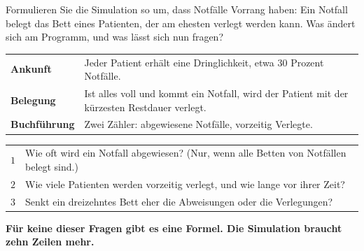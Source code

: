 \begin{aufgabe}
Formulieren Sie die Simulation so um, dass Notfälle Vorrang haben: Ein Notfall belegt das Bett eines Patienten, der am ehesten verlegt werden kann. Was ändert sich am Programm, und was lässt sich nun fragen?

\loesung
{}
\begin{center}
{\small
\renewcommand{\arraystretch}{1.5}
\begin{tabular}{@{}P{2.6cm}P{6.0cm}@{}}
\toprule
\textbf{Ankunft} & Jeder Patient erhält eine Dringlichkeit, etwa $30$ Prozent Notfälle.\\
\textbf{Belegung} & Ist alles voll und kommt ein Notfall, wird der Patient mit der kürzesten Restdauer verlegt.\\
\textbf{Buchführung} & Zwei Zähler: abgewiesene Notfälle, vorzeitig Verlegte.\\
\bottomrule
\end{tabular}}
\end{center}

\begin{center}
{\small
\renewcommand{\arraystretch}{1.5}
\begin{tabular}{@{}P{1.0cm}P{7.4cm}@{}}
\toprule
$1$ & Wie oft wird ein Notfall abgewiesen? (Nur, wenn alle Betten von Notfällen belegt sind.)\\
$2$ & Wie viele Patienten werden vorzeitig verlegt, und wie lange vor ihrer Zeit?\\
$3$ & Senkt ein dreizehntes Bett eher die Abweisungen oder die Verlegungen?\\
\bottomrule
\end{tabular}}
\end{center}

\begin{center}
\begin{minipage}{0.9\textwidth}
\textbf{Für keine dieser Fragen gibt es eine Formel. Die Simulation braucht zehn Zeilen mehr.}
\end{minipage}
\end{center}

\begin{center}
\begin{minipage}{0.88\textwidth}
\end{minipage}
\end{center}
\end{aufgabe}

